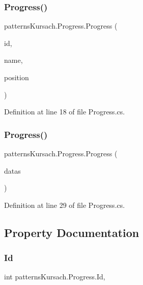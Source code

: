\subsubsection{\texorpdfstring{Progress()}{Progress()}\hspace{0.1cm}{\footnotesize\ttfamily [1/2]}}
{\footnotesize\ttfamily patterns\+Kursach.\+Progress.\+Progress (\begin{DoxyParamCaption}\item[{int}]{id,  }\item[{string}]{name,  }\item[{int}]{position }\end{DoxyParamCaption})}



Definition at line 18 of file Progress.\+cs.

\mbox{\label{classpatterns_kursach_1_1_progress_abfb0c1805d881ed4a36a08288093ac57}} 
\subsubsection{\texorpdfstring{Progress()}{Progress()}\hspace{0.1cm}{\footnotesize\ttfamily [2/2]}}
{\footnotesize\ttfamily patterns\+Kursach.\+Progress.\+Progress (\begin{DoxyParamCaption}\item[{Data\+Row}]{datas }\end{DoxyParamCaption})}



Definition at line 29 of file Progress.\+cs.



\subsection{Property Documentation}
\mbox{\label{classpatterns_kursach_1_1_progress_ae639d8ba609612325b731e91a901927a}} 
\subsubsection{\texorpdfstring{Id}{Id}}
{\footnotesize\ttfamily int patterns\+Kursach.\+Progress.\+Id\hspace{0.3cm}{\ttfamily [get]}, {\ttfamily [set]}}



